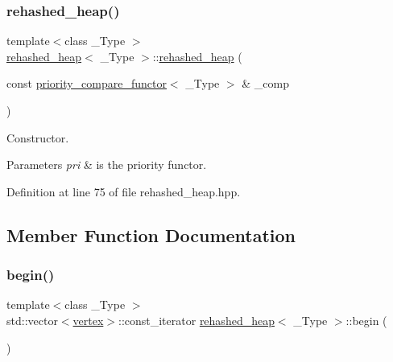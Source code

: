 \subsubsection{\texorpdfstring{rehashed\+\_\+heap()}{rehashed\_heap()}}
{\footnotesize\ttfamily template$<$class \+\_\+\+Type $>$ \\
\hyperlink{structrehashed__heap}{rehashed\+\_\+heap}$<$ \+\_\+\+Type $>$\+::\hyperlink{structrehashed__heap}{rehashed\+\_\+heap} (\begin{DoxyParamCaption}\item[{const \hyperlink{structpriority__compare__functor}{priority\+\_\+compare\+\_\+functor}$<$ \+\_\+\+Type $>$ \&}]{\+\_\+comp }\end{DoxyParamCaption})\hspace{0.3cm}{\ttfamily [inline]}}



Constructor. 


\begin{DoxyParams}{Parameters}
{\em pri} & is the priority functor. \\
\hline
\end{DoxyParams}


Definition at line 75 of file rehashed\+\_\+heap.\+hpp.



\subsection{Member Function Documentation}
\mbox{\label{structrehashed__heap_ae0343798d9399ca2fb9623de6b9315d5}} 
\subsubsection{\texorpdfstring{begin()}{begin()}}
{\footnotesize\ttfamily template$<$class \+\_\+\+Type $>$ \\
std\+::vector$<$\hyperlink{graph_8hpp_abefdcf0544e601805af44eca032cca14}{vertex}$>$\+::const\+\_\+iterator \hyperlink{structrehashed__heap}{rehashed\+\_\+heap}$<$ \+\_\+\+Type $>$\+::begin (\begin{DoxyParamCaption}{ }\end{DoxyParamCaption})\hspace{0.3cm}{\ttfamily [inline]}}



